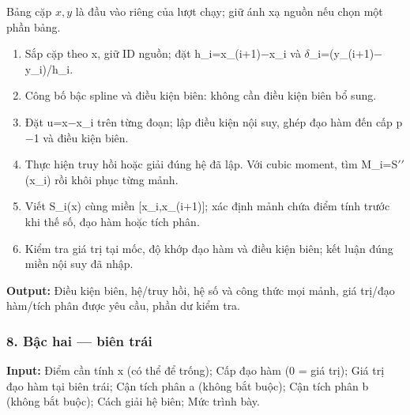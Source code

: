 Bảng cặp $x,y$ là đầu vào riêng của lượt chạy; giữ ánh xạ nguồn nếu chọn một phần bảng.

\begin{enumerate}

\item Sắp cặp theo x,\allowbreak{} giữ ID nguồn;\allowbreak{} đặt h\_i=\allowbreak{}x\_(\allowbreak{}i+\allowbreak{}1)\ensuremath{-}x\_i và \ensuremath{\delta}\_i=\allowbreak{}(\allowbreak{}y\_(\allowbreak{}i+\allowbreak{}1)\ensuremath{-}y\_i)/\allowbreak{}h\_i.

\item Công bố bậc spline và điều kiện biên: không cần điều kiện biên bổ sung.

\item Đặt u=\allowbreak{}x\ensuremath{-}x\_i trên từng đoạn;\allowbreak{} lập điều kiện nội suy,\allowbreak{} ghép đạo hàm đến cấp p\ensuremath{-}1 và điều kiện biên.

\item Thực hiện truy hồi hoặc giải đúng hệ đã lập. Với cubic moment,\allowbreak{} tìm M\_i=\allowbreak{}S\ensuremath{\prime\prime}(\allowbreak{}x\_i) rồi khôi phục từng mảnh.

\item Viết S\_i(\allowbreak{}x) cùng miền [x\_i,\allowbreak{}x\_(\allowbreak{}i+\allowbreak{}1)];\allowbreak{} xác định mảnh chứa điểm tính trước khi thế số,\allowbreak{} đạo hàm hoặc tích phân.

\item Kiểm tra giá trị tại mốc,\allowbreak{} độ khớp đạo hàm và điều kiện biên;\allowbreak{} kết luận đúng miền nội suy đã nhập.

\end{enumerate}

\textbf{Output:} Điều kiện biên,\allowbreak{} hệ/\allowbreak{}truy hồi,\allowbreak{} hệ số và công thức mọi mảnh,\allowbreak{} giá trị/\allowbreak{}đạo hàm/\allowbreak{}tích phân được yêu cầu,\allowbreak{} phần dư kiểm tra.

\examplebreak\subsubsection*{8. Bậc hai — biên trái}

\textbf{Input:} Điểm cần tính x (\allowbreak{}có thể để trống);\allowbreak{} Cấp đạo hàm (\allowbreak{}0 =\allowbreak{} giá trị);\allowbreak{} Giá trị đạo hàm tại biên trái;\allowbreak{} Cận tích phân a (\allowbreak{}không bắt buộc);\allowbreak{} Cận tích phân b (\allowbreak{}không bắt buộc);\allowbreak{} Cách giải hệ biên;\allowbreak{} Mức trình bày.

